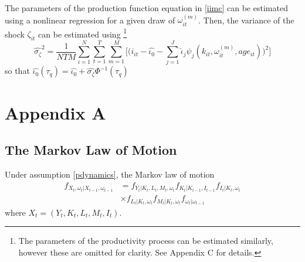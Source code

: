 \documentclass{article}
\begin{document}
\begin{enumerate}
    The parameters of the production function equation in \eqref{iimc} can be estimated using a nonlinear regression for a given draw of $\omega_{it}^{(m)}$. Then, the variance of the shock $\zeta_{it}$ can be estimated using \footnote{The parameters of the productivity process can be estimated similarly, however these are omitted for clarity. See Appendix C for details.}
     \begin{equation}\label{staticivar}
     \hat{\sigma_{\zeta}}^{2}=\frac{1}{NTM}\sum_{i=1}^{N}\sum_{t=1}^{T}\sum_{m=1}^{M}\Bigg[\Bigg(i_{it}-\hat{\iota_{0}}-\sum_{j=1}^{J}\hat{\iota}_{j}\psi_{j}(k_{it}, \omega_{it}^{(m)}, age_{it})\Bigg)^{2}\Bigg]
     \end{equation}
     so that $\hat{\iota_{0}}(\tau_{q})=\hat{\iota_{0}}+\hat{\sigma_{\zeta}}\Phi^{-1}(\tau_{q})$
\end{enumerate}

\pagebreak
\newpage



\pagebreak
\newpage

\appendix

\section*{Appendix A}
\subsection*{The Markov Law of Motion}
Under assumption \eqref{pdynamics}, the Markov law of motion 
\begin{equation*}
    \begin{split}
        f_{X_{t}, \omega_{t}|X_{t-1}, \omega_{t-1}}&=f_{Y_{t}|K_{t}, L_{t}, M_{t}, \omega_{t}}f_{K_{t}|K_{t-1}, I_{t-1}}f_{I_{t}|K_{t}, \omega_{t}}\\
                &\times f_{L_{t}|K_{t}, \omega_{t}}f_{M_{t}|K_{t}, \omega_{t}}f_{\omega_{t}|\omega_{t-1}}
    \end{split}
\end{equation*}
where $X_{t}=(Y_{t}, K_{t}, L_{t}, M_{t}, I_{t})$.\\
\end{document}
